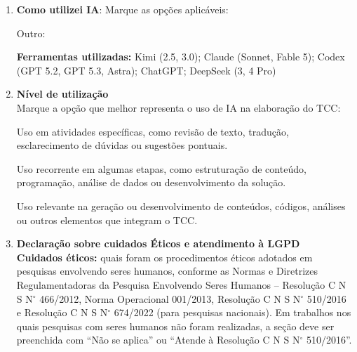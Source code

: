 \begin{enumerate}
\item \textbf{Como utilizei IA}: Marque as opções aplicáveis:

\vspace{0.32cm}
\vspace{0.24cm}
\vspace{0.24cm}
\vspace{0.24cm}
\vspace{0.24cm}
\vspace{0.24cm}
\vspace{0.24cm}
\noindent\checkbox\hspace{0.12cm}Outro: \formline{10.95cm}

\vspace{0.42cm}
\textbf{Ferramentas utilizadas:} Kimi (2.5, 3.0); Claude (Sonnet, Fable 5); Codex (GPT 5.2, GPT 5.3, Astra); ChatGPT; DeepSeek (3, 4 Pro)

\vspace{0.48cm}
\formline{15.25cm}

\vspace*{0.45cm}

\item \textbf{Nível de utilização}\\
\noindent Marque a opção que melhor representa o uso de IA na elaboração do TCC:

\vspace{0.38cm}
Uso em atividades específicas, como revisão de texto, tradução, esclarecimento de dúvidas ou sugestões pontuais.

\vspace{0.38cm}
Uso recorrente em algumas etapas, como estruturação de conteúdo, programação, análise de dados ou desenvolvimento da solução.

\vspace{0.38cm}
Uso relevante na geração ou desenvolvimento de conteúdos, códigos, análises ou outros elementos que integram o TCC.

\vspace{0.72cm}
\item \textbf{Declaração sobre cuidados Éticos e atendimento à LGPD}\\
\textbf{Cuidados éticos:} quais foram os procedimentos éticos adotados em pesquisas envolvendo seres humanos, conforme as Normas e Diretrizes Regulamentadoras da Pesquisa Envolvendo Seres Humanos -- Resolução C N S N$^\circ$ 466/2012, Norma Operacional 001/2013, Resolução C N S N$^\circ$ 510/2016 e Resolução C N S N$^\circ$ 674/2022 (para pesquisas nacionais). Em trabalhos nos quais pesquisas com seres humanos não foram realizadas, a seção deve ser preenchida com ``Não se aplica'' ou ``Atende à Resolução C N S N$^\circ$ 510/2016''.


\end{enumerate}
